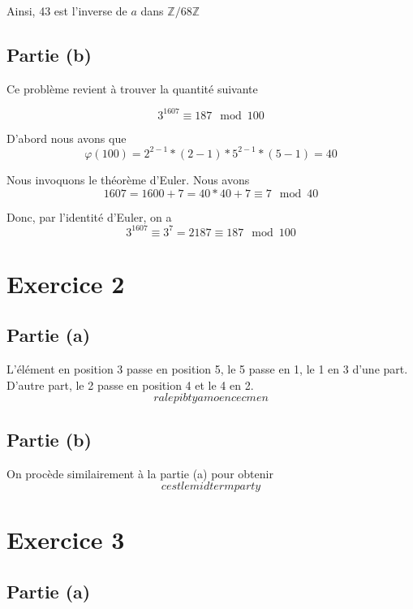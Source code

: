 \documentclass[12pt]{article}
\begin{document}
Ainsi, 43 est l'inverse de $a$ dans $\mathbb{Z} / 68 \mathbb{Z}$

\subsection{Partie (b)}

Ce problème revient à trouver la quantité suivante

$$3^{1607} \equiv 187 \mod 100$$

D'abord nous avons que
$$\varphi (100) = 2^{2-1} * (2 - 1) * 5^{2-1} * (5 - 1) = 40$$

Nous invoquons le théorème d'Euler. Nous avons
$$1607 = 1600 + 7 = 40 * 40 + 7 \equiv 7 \mod 40$$

Donc, par l’identité d’Euler, on a
$$3^{1607} \equiv 3^7 = 2187 \equiv 187 \mod 100$$



\section{Exercice 2}
\subsection{Partie (a)}

L'élément en position 3 passe en position 5, le 5 passe en 1, le 1 en 3 d'une part. D'autre part, le 2 passe en position 4 et le 4 en 2.
$$ralepibtyamoencecmen$$

\subsection{Partie (b)}

On procède similairement à la partie (a) pour obtenir
$$cestlemidtermparty$$


\section{Exercice 3}
\subsection{Partie (a)}
\end{document}
